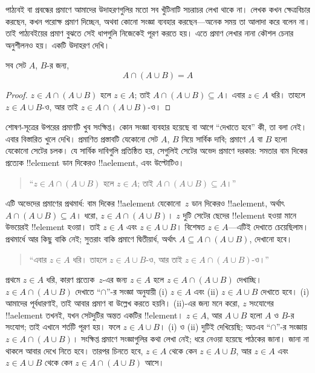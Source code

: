\documentclass[../../../include/open-logic-section]{subfiles}
\begin{document}

পাঠ্যবই বা প্রবন্ধের প্রমাণে আমাদের উদাহরণগুলির মতো
সব খুঁটিনাটি সচরাচর লেখা থাকে না। লেখক কখন
ক্ষেত্রবিচার করছেন, কখন পরোক্ষ প্রমাণ দিচ্ছেন,
অথবা কোনো সংজ্ঞা ব্যবহার করছেন—অনেক সময় তা
আলাদা করে বলেন না। তাই পাঠ্যবইয়ের প্রমাণ বুঝতে
সেই ধাপগুলি নিজেকেই পূরণ করতে হয়। এতে প্রমাণ
লেখার নানা কৌশল চেনার অনুশীলনও হয়। একটি উদাহরণ দেখি।

\begin{prop}[শোষণ]
সব সেট $A$, $B$-র জন্য,
\[
A \cap (A \cup B) = A
\]
\end{prop}

\begin{proof}
$z \in A \cap (A \cup B)$ হলে $z \in A$;
তাই $A \cap (A \cup B) \subseteq A$। এবার
$z \in A$ ধরি। তাহলে $z \in A \cup B$-ও,
আর তাই $z \in A \cap (A \cup B)$-ও।
\end{proof}

শোষণ-সূত্রের উপরের প্রমাণটি খুব সংক্ষিপ্ত। কোন
সংজ্ঞা ব্যবহার হয়েছে বা আগে ``দেখাতে হবে''
কী, তা বলা নেই। এবার বিস্তারিত খুলে দেখি।
প্রমাণিত প্রস্তাবটি যেকোনো সেট $A$, $B$ নিয়ে
সার্বিক দাবি; প্রমাণে $A$ বা $B$ হলো যেকোনো
সেটের চলক। যে সার্বিক দাবিগুলি প্রতিষ্ঠিত হয়,
সেগুলিই সেটের অভেদ প্রমাণে দরকার: সমতার বাম
দিকের প্রত্যেক !!{element} ডান দিকেরও
!!a{element}, এবং উল্টোটিও।

\begin{quote}
``$z \in A \cap (A \cup B)$ হলে $z \in A$;
তাই $A \cap (A \cup B) \subseteq A$।''
\end{quote}

এটি অভেদের প্রমাণের প্রথমার্ধ: বাম দিকের
!!a{element} যেকোনো~$z$ ডান দিকেরও
!!a{element}, অর্থাৎ
$A \cap (A \cup B) \subseteq A$। ধরো,
$z \in A \cap (A \cup B)$। $z$ দুটি সেটের ছেদের
!!{element} হওয়া মানে উভয়েরই !!{element}
হওয়া। তাই $z \in A$ এবং $z \in A \cup B$।
বিশেষত $z \in A$—এটিই দেখাতে চেয়েছিলাম।
প্রথমার্ধে আর কিছু বাকি নেই; সুতরাং বাকি প্রমাণে
দ্বিতীয়ার্ধ, অর্থাৎ $A \subseteq A \cap
(A \cup B)$, দেখানো হবে।

\begin{quote}
``এবার $z \in A$ ধরি। তাহলে $z \in A \cup B$-ও,
আর তাই $z \in A \cap (A \cup B)$-ও।''
\end{quote}

প্রথমে $z \in A$ ধরি, কারণ প্রত্যেক~$z$-এর
জন্য $z \in A$ হলে $z \in A \cap (A \cup B)$
দেখাচ্ছি। $z \in A \cap (A \cup B)$ দেখাতে
``$\cap$''-র সংজ্ঞা অনুযায়ী (i) $z \in A$
এবং (ii) $z \in A \cup B$ দেখাতে হবে। (i)
আমাদের পূর্বধারণাই, তাই আবার প্রমাণ বা উল্লেখ
করতে হয়নি। (ii)-এর জন্য মনে করো, $z$ সংযোগের
!!a{element} তখনই, যখন সেটদুটির অন্তত একটির
!!{element}। $z \in A$, আর $A \cup B$ হলো
$A$ ও $B$-র সংযোগ; তাই এখানে শর্তটি পূরণ
হয়। ফলে $z \in A \cup B$। (i) ও (ii)
দুটিই দেখিয়েছি; অতএব ``$\cap$''-র সংজ্ঞায়
$z \in A \cap (A \cup B)$। সংক্ষিপ্ত প্রমাণে
সংজ্ঞাগুলির কথা লেখা নেই; ধরে নেওয়া হয়েছে
পাঠকের জানা। জানা না থাকলে আবার দেখে নিতে
হবে। তারপর চিনতে হবে, $z \in A$ থেকে কেন
$z \in A \cup B$, আর $z \in A$ এবং
$z \in A \cup B$ থেকে কেন
$z \in A \cap (A \cup B)$ আসে।
\end{document}
